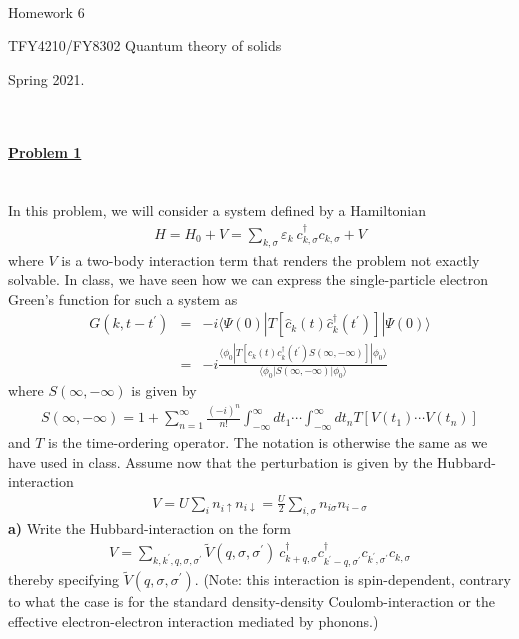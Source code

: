 \documentclass{article}
\begin{document}
\\

\centerline{\Large Homework 6}
\centerline{\Large  TFY4210/FY8302 Quantum theory of solids}
\centerline{\Large Spring 2021.}
\normalsize
\ \\
\ \\
\underline{\large\bf Problem 1 }\\
\ \\
\ \\
In this problem, we will consider a system defined by a Hamiltonian
\begin{eqnarray}
H = H_0 + V =  \sum_{k,\sigma} \varepsilon_k ~c^{\dagger}_{k,\sigma} c_{k,\sigma} + V \nonumber 
\end{eqnarray}
where $V$ is a two-body interaction term that renders the problem not exactly solvable.  
In class, we have seen how we can express the single-particle electron Green's function for such a system as 
\begin{eqnarray}
G(k, t-t^{\prime}) & = & -i \langle \Psi(0) | T \left[ \hat c_{k} (t)  \hat c^{\dagger}_{k} (t^{\prime})  \right] | \Psi(0) \rangle \nonumber \\
& = & -i \frac{ \langle \phi_0 | T \left[ c_{k} (t)  c^{\dagger}_{k} (t^{\prime})S(\infty,-\infty)  \right]| \phi_0 \rangle}{\langle  \phi_0   | S(\infty,-\infty)  |  \phi_0  \rangle } \nonumber
\end{eqnarray} 
where $S(\infty,-\infty)$ is given by
\begin{eqnarray}
S(\infty,-\infty) = 1 + \sum_{n=1}^{\infty} \frac{(-i)^n}{n!} \int_{-\infty}^{\infty} dt_1 \cdots \int_{-\infty}^{\infty} dt_n T \left[ V(t_1) \cdots  V(t_n) \right] \nonumber 
\end{eqnarray}
and $T$ is the time-ordering operator. The notation is otherwise the same as we have used in class. Assume now that the perturbation is given by the Hubbard-interaction
\begin{eqnarray}
V = U \sum_i n_{i \uparrow} n_{i \downarrow} =\frac{U}{2} \sum_{i,\sigma} n_{i \sigma} n_{i -\sigma}  \nonumber
\end{eqnarray}
{\bf a)} Write the Hubbard-interaction on the form 
\begin{eqnarray}
V = \sum_{k,k^{\prime},q,\sigma,\sigma^{\prime}} \tilde V(q,\sigma,\sigma^{\prime}) ~ c^{\dagger}_{k+q,\sigma} c^{\dagger}_{k^{\prime}-q,\sigma^{\prime}}
c_{k^{\prime},\sigma^{\prime}} c_{k,\sigma} \nonumber 
\end{eqnarray}
thereby specifying $ \tilde V(q,\sigma,\sigma^{\prime}) $. (Note: this interaction is spin-dependent, contrary to what the case is for the standard density-density Coulomb-interaction or the effective electron-electron interaction mediated by phonons.)
\end{document}
